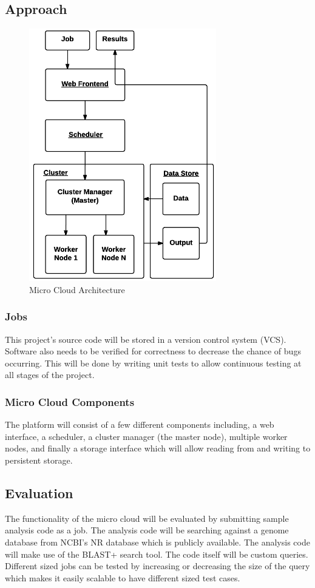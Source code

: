 \documentclass{sig-alternate-05-2015}
\begin{document}
\subsection{Approach}
\begin{figure}
\centering
\includegraphics[scale=0.8]{img/microcloud_architecture}
\caption{Micro Cloud Architecture}
\end{figure}
\subsubsection{Jobs}
This project's source code will be stored in a version control system (VCS). Software also needs to be verified for correctness to decrease the chance of bugs occurring. This will be done by writing unit tests to allow continuous testing at all stages of the project.

\subsubsection{Micro Cloud Components}
The platform will consist of a few different components including, a web interface, a scheduler, a cluster manager (the master node), multiple worker nodes, and finally a storage interface which will allow reading from and writing to persistent storage. 



\subsection{Evaluation}
The functionality of the micro cloud will be evaluated by submitting sample analysis code as a job. The analysis code will be searching against a genome database from NCBI's NR database which is publicly available. The analysis code will make use of the BLAST+ search tool. The code itself will be custom queries. Different sized jobs can be tested by increasing or decreasing the size of the query which makes it easily scalable to have different sized test cases.
\end{document}
